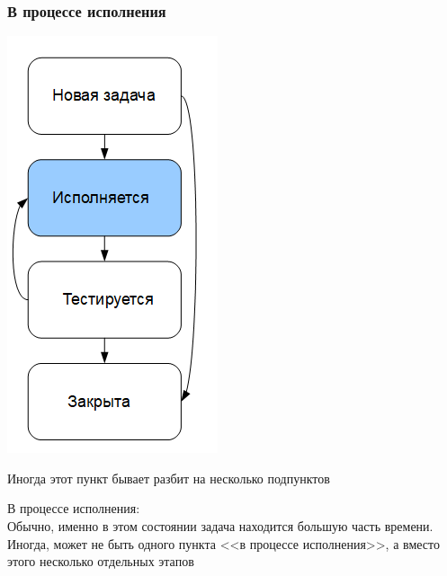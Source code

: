 \documentclass{../industrial-development}
\begin{document}
\begin{frame} \frametitle{В процессе исполнения}
\begin{minipage}{0.4\textwidth}
  \begin{flushleft}
		\includegraphics[height=0.8\textheight]{cyc3.png}
  \end{flushleft}
\end{minipage}
\begin{minipage}{0.59\textwidth}
  \begin{flushright}
		\begin{block}{}
			Иногда этот пункт бывает разбит на несколько подпунктов
		\end{block}
  \end{flushright}
\end{minipage}
\end{frame}
\lecturenotes
В процессе исполнения:\\
Обычно, именно в этом состоянии задача находится большую часть времени. Иногда, может не быть одного пункта <<в процессе исполнения>>, а вместо этого несколько отдельных этапов
\end{document}

